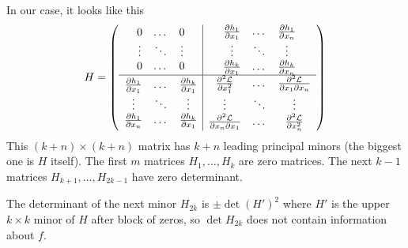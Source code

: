 \documentclass[11pt,a4paper]{book}
\theoremstyle{definition}\newtheorem{definition}{Definition}
\theoremstyle{definition}\newtheorem{fact}{Fact}
\theoremstyle{definition}\newtheorem{remark}{Remark}
\theoremstyle{definition}\newtheorem{ex}{Ex.}
\theoremstyle{definition}\newtheorem{project}{Project}
\theoremstyle{definition}\newtheorem{problem}{Problem}
\theoremstyle{definition}\newtheorem{example}{Example}
\numberwithin{theorem}{section}
\numberwithin{corollary}{chapter}
\numberwithin{assumption}{chapter}
\numberwithin{definition}{chapter}
\numberwithin{prop}{chapter}
\numberwithin{notation}{chapter}
\numberwithin{problem}{chapter}
\numberwithin{example}{chapter}
\numberwithin{fact}{chapter}
\numberwithin{ex}{chapter}
\begin{document}
	In our case, it looks like this
	\begin{equation*}
		H = \left( \begin{array}{c | c}
			\begin{matrix}
				0      & \dots  & 0      \\
				\vdots & \ddots & \vdots \\
				0      & \dots  & 0      
			\end{matrix} & 
			\begin{matrix}
				\frac{\partial h_1}{\partial x_1} & \dots  & \frac{\partial h_1}{\partial x_n} \\
				\vdots                            & \ddots & \vdots                            \\
				\frac{\partial h_k}{\partial x_1} & \dots  & \frac{\partial h_k}{\partial x_n} 
			\end{matrix} \\
			\hline
			\begin{matrix}
				\frac{\partial h_1}{\partial x_1} & \dots & \frac{\partial h_k}{\partial x_1} \\
				\vdots                            & \ddots & \vdots                            \\
				\frac{\partial h_1}{\partial x_n} & \dots  & \frac{\partial h_k}{\partial x_1} 
			\end{matrix} & 
			\begin{matrix}
				\frac{\partial^2 \mathcal{L}}{\partial x_1^2}            & \dots  & \frac{\partial^2 \mathcal{L}}{\partial x_1 \partial x_n} \\
				\vdots                                                   & \ddots & \vdots                                                 \\
				\frac{\partial^2 \mathcal{L}}{\partial x_n \partial x_1} & \dots  & \frac{\partial^2 \mathcal{L}}{\partial x_n^2}          
			\end{matrix}
		\end{array} \right)
	\end{equation*}
	This $(k+n) \times (k+n)$ matrix has $k+n$ leading principal minors (the biggest one is $H$ itself). The first $m$ matrices $H_1, \dots , H_k$ are zero matrices. The next  $k - 1$ matrices $H_{k+1}, \dots , H_{2k-1}$ have zero determinant.
	
	The determinant of the next minor $H_{2k}$ is $\pm \det(H')^2$ where $H'$ is the upper $k \times k $ minor of $H$ after block of zeros, so $\det H_{2k}$ does not contain information about $f$.
	
\end{document}
